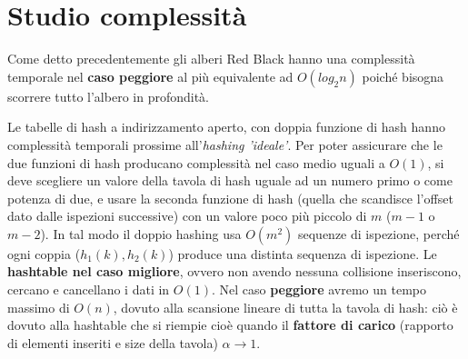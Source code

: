 \def\baselinestretch{1}
\section{Studio complessit\`a}
\def\baselinestretch{1.66}
\thispagestyle{headings}
\indent Come detto precedentemente gli alberi Red Black hanno una complessit\`a temporale
nel \textbf{caso peggiore} al pi\`u equivalente ad $O(log_2 n)$ poich\'e bisogna scorrere tutto
l'albero in profondit\`a.\newline

\indent Le tabelle di hash a indirizzamento aperto, con doppia funzione di hash hanno complessit\`a temporali
prossime all'\textit{hashing 'ideale'}. Per poter assicurare che le due funzioni di hash producano
complessit\`a nel caso medio uguali a $O(1)$, si deve scegliere un valore della tavola di hash uguale ad
un numero primo o come potenza di due, e usare la seconda funzione di hash (quella che scandisce l'offset
dato dalle ispezioni successive) con un valore poco pi\`u piccolo di $m$ ($m-1$ o $m-2$).
In tal modo il doppio hashing usa $O(m^2)$ sequenze di ispezione,
perch\'e ogni coppia ($h_1(k), h_2(k)$) produce una distinta sequenza di ispezione.
Le \textbf{hashtable nel caso migliore}, ovvero non avendo nessuna collisione inseriscono,
cercano e cancellano i dati in $O(1)$.
Nel caso \textbf{peggiore} avremo un tempo massimo di $O(n)$,
dovuto alla scansione lineare di tutta la tavola di hash: ci\`o \`e  dovuto alla hashtable che si riempie
cio\`e quando il \textbf{ fattore di carico} (rapporto di elementi
inseriti e size della tavola) $\alpha\rightarrow 1$.\newline

